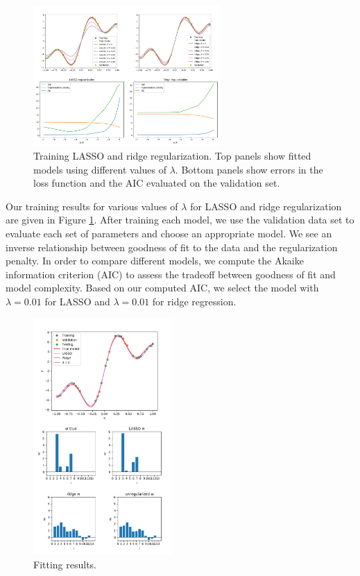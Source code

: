 \documentclass[10pt, twocolumn]{article}
\begin{document}
\begin{figure}
\caption{Training LASSO and ridge regularization. Top panels show fitted models using different values of $\lambda$. Bottom panels show errors in the loss function and the AIC evaluated on the validation set.}
\begin{center}
\includegraphics[width=270px]{all_training}
\end{center}
\label{fig:train_lasso}
\end{figure}

Our training results for various values of $\lambda$ for LASSO and ridge regularization are given in Figure \ref{fig:train_lasso}. After training each model, we use the validation data set to evaluate each set of parameters and choose an appropriate model. We see an inverse relationship between goodness of fit to the data and the regularization penalty. In order to compare different models, we compute the Akaike information criterion (AIC) to assess the tradeoff between goodness of fit and model complexity. Based on our computed AIC, we select the model with $\lambda=0.01$ for LASSO and $\lambda=0.01$ for ridge regression.

\begin{figure}
\caption{Fitting results.}
\begin{center}
\includegraphics[width=200px]{final_fitting_results}
\end{center}
\label{fig:final_lasso_test}
\end{figure}
\end{document}
